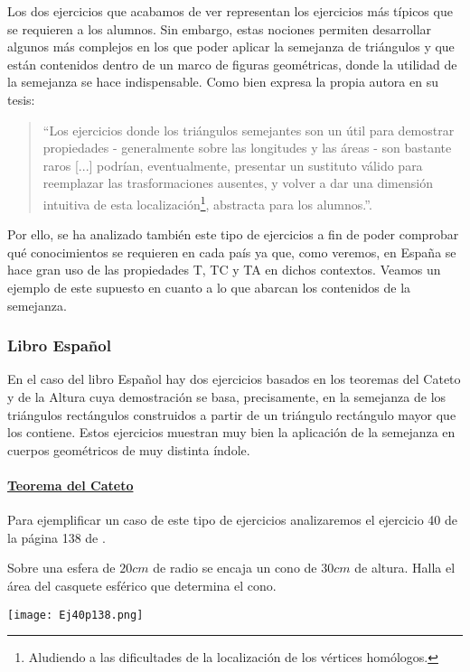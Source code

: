 	Los dos ejercicios que acabamos de ver representan los ejercicios más típicos que se requieren a los alumnos. Sin embargo, estas nociones permiten desarrollar algunos más complejos en los que poder aplicar la semejanza de triángulos y que están contenidos dentro de un marco de figuras geométricas, donde la utilidad de la semejanza se hace indispensable. Como bien expresa la propia autora en su tesis:
	
	\begin{quote}\small
		``Los ejercicios donde los triángulos semejantes son un útil para demostrar propiedades - generalmente sobre las longitudes y las áreas - son bastante raros [...] podrían, eventualmente, presentar un sustituto válido para reemplazar las trasformaciones ausentes, y volver a dar una dimensión intuitiva de esta localización\footnote{Aludiendo a las dificultades de la localización de los vértices homólogos.}, abstracta para los alumnos.''\cite[p. 340]{TH}.
	\end{quote}
	
	Por ello, se ha analizado también este tipo de ejercicios a fin de poder comprobar qué conocimientos se requieren en cada país ya que, como veremos, en España se hace gran uso de las propiedades T, TC y TA en dichos contextos. Veamos un ejemplo de este supuesto en cuanto a lo que abarcan los contenidos de la semejanza.
	
\subsubsection{Libro Español}

	En el caso del libro Español hay dos ejercicios basados en los teoremas del Cateto y de la Altura cuya demostración se basa, precisamente, en la semejanza de los triángulos rectángulos construidos a partir de un triángulo rectángulo mayor que los contiene. Estos ejercicios muestran muy bien la aplicación de la semejanza en cuerpos geométricos de muy distinta índole.
	
	\paragraph{\underline{Teorema del Cateto}} Para ejemplificar un caso de este tipo de ejercicios analizaremos el ejercicio 40 de la página 138 de \citet{spa}.
	
	\begin{multicols}{2}
		
		\begin{minipage}{7cm}
			Sobre una esfera de $20cm$ de radio se encaja un cono de $30cm$ de altura.
Halla el área del casquete esférico que determina el cono.
		\end{minipage}
		
	\columnbreak
	
	\begin{center}
		\texttt{[image: Ej40p138.png]}
	\end{center}
	\end{multicols}
	

